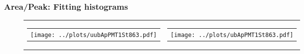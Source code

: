 \documentclass[aspectratio=169]{beamer}
\begin{document}
\begin{frame}
	\frametitle{Area/Peak: Fitting histograms}
	\begin{figure}
		\centering
		\begin{tabularx}{\textwidth}{CC}
			\begin{tabular}{l}
				\texttt{[image: ../plots/uubApPMT1St863.pdf]}
			\end{tabular}
			&
			\begin{tabular}{l}
				\texttt{[image: ../plots/ubApPMT1St863.pdf]}
			\end{tabular}
		\end{tabularx}
	\end{figure}
\end{frame}
\end{document}
